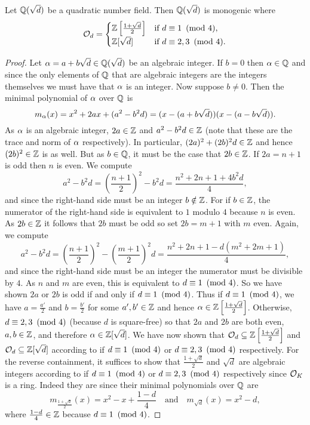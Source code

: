     \begin{proposition}\label{prop:ring_of_integers_quadratic}
      Let $\mathbb{Q}(\sqrt{d})$ be a quadratic number field. Then $\mathbb{Q}(\sqrt{d})$ is monogenic where
      \[
        \mathcal{O}_{d} = \begin{cases} \mathbb{Z}\left[\frac{1+\sqrt{d}}{2}\right] & \text{if $d \equiv 1 \ \left(\text{mod }4\right)$}, \\ \mathbb{Z}[\sqrt{d}] & \text{if $d \equiv 2,3 \ \left(\text{mod }4\right)$}. \end{cases}
      \]
    \end{proposition}
    \begin{proof}
      Let $\alpha = a+b\sqrt{d} \in \mathbb{Q}(\sqrt{d})$ be an algebraic integer. If $b = 0$ then $\alpha \in \mathbb{Q}$ and since the only elements of $\mathbb{Q}$ that are algebraic integers are the integers themselves we must have that $\alpha$ is an integer. Now suppose $b \neq 0$. Then the minimal polynomial of $\alpha$ over $\mathbb{Q}$ is
      \[
        m_{\alpha}(x) = x^{2}+2ax+(a^{2}-b^{2}d) = (x-(a+b\sqrt{d}))(x-(a-b\sqrt{d})).
      \]
      As $\alpha$ is an algebraic integer, $2a \in \mathbb{Z}$ and $a^{2}-b^{2}d \in \mathbb{Z}$ (note that these are the trace and norm of $\alpha$ respectively). In particular, $(2a)^{2}+(2b)^{2}d \in \mathbb{Z}$ and hence $(2b)^{2} \in \mathbb{Z}$ is as well. But as $b \in \mathbb{Q}$, it must be the case that $2b \in \mathbb{Z}$. If $2a = n+1$ is odd then $n$ is even. We compute
      \[
        a^{2}-b^{2}d = \left(\frac{n+1}{2}\right)^{2}-b^{2}d = \frac{n^{2}+2n+1+4b^{2}d}{4},
      \]
      and since the right-hand side must be an integer $b \notin \mathbb{Z}$. For if $b \in \mathbb{Z}$, the numerator of the right-hand side is equivalent to $1$ modulo $4$ because $n$ is even. As $2b \in \mathbb{Z}$ it follows that $2b$ must be odd so set $2b = m+1$ with $m$ even. Again, we compute
      \[
        a^{2}-b^{2}d = \left(\frac{n+1}{2}\right)^{2}-\left(\frac{m+1}{2}\right)^{2}d = \frac{n^{2}+2n+1-d(m^{2}+2m+1)}{4},
      \]
      and since the right-hand side must be an integer the numerator must be divisible by $4$. As $n$ and $m$ are even, this is equivalent to $d \equiv 1 \ \left(\text{mod }4\right)$. So we have shown $2a$ or $2b$ is odd if and only if $d \equiv 1 \ \left(\text{mod }4\right)$. Thus if $d \equiv 1 \ \left(\text{mod }4\right)$, we have $a = \frac{a'}{2}$ and $b = \frac{b'}{2}$ for some $a',b' \in \mathbb{Z}$ and hence $\alpha \in \mathbb{Z}\left[\frac{1+\sqrt{d}}{2}\right]$. Otherwise, $d \equiv 2,3 \ \left(\text{mod }4\right)$ (because $d$ is square-free) so that $2a$ and $2b$ are both even, $a,b \in \mathbb{Z}$, and therefore $\alpha \in \mathbb{Z}[\sqrt{d}]$. We have now shown that $\mathcal{O}_{d} \subseteq \mathbb{Z}\left[\frac{1+\sqrt{d}}{2}\right]$ and $\mathcal{O}_{d} \subseteq \mathbb{Z}[\sqrt{d}]$ according to if $d \equiv 1 \ \left(\text{mod }4\right)$ or $d \equiv 2,3 \ \left(\text{mod }4\right)$ respectively. For the reverse containment, it suffices to show that $\frac{1+\sqrt{d}}{2}$ and $\sqrt{d}$ are algebraic integers according to if $d \equiv 1 \ \left(\text{mod }4\right)$ or $d \equiv 2,3 \ \left(\text{mod }4\right)$ respectively since $\mathcal{O}_{K}$ is a ring. Indeed they are since their minimal polynomials over $\mathbb{Q}$ are
      \[
        m_{\frac{1+\sqrt{d}}{2}}(x) = x^{2}-x+\frac{1-d}{4} \quad \text{and} \quad m_{\sqrt{d}}(x) = x^{2}-d,
      \]
      where $\frac{1-d}{4} \in \mathbb{Z}$ because $d \equiv 1 \ \left(\text{mod }4\right)$.
    \end{proof}


